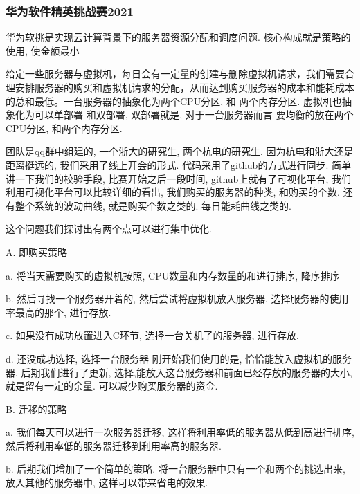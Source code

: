 \documentclass[UTF8]{ctexart}
\begin{document}
\subsubsection{华为软件精英挑战赛2021}
华为软挑是实现云计算背景下的服务器资源分配和调度问题.  核心构成就是策略的使用, 使金额最小 \par
给定一些服务器与虚拟机，每日会有一定量的创建与删除虚拟机请求，我们需要合理安排服务器的购买和虚拟机请求的分配，从而达到购买服务器的成本和能耗成本的总和最低。一台服务器的抽象化为两个CPU分区, 和 两个内存分区.  虚拟机也抽象化为可以单部署 和双部署, 双部署就是, 对于一台服务器而言 要均衡的放在两个CPU分区, 和两个内存分区. \par
团队是qq群中组建的, 一个浙大的研究生, 两个杭电的研究生. 因为杭电和浙大还是距离挺远的, 我们采用了线上开会的形式.  代码采用了github的方式进行同步. 简单讲一下我们的校验手段, 比赛开始之后一段时间, github上就有了可视化平台, 我们利用可视化平台可以比较详细的看出, 我们购买的服务器的种类, 和购买的个数.  还有整个系统的波动曲线, 就是购买个数之类的. 每日能耗曲线之类的. \par
这个问题我们探讨出有两个点可以进行集中优化. \par

A. 即购买策略\par
a. 将当天需要购买的虚拟机按照, CPU数量和内存数量的和进行排序, 降序排序\par
b. 然后寻找一个服务器开着的, 然后尝试将虚拟机放入服务器, 选择服务器的使用率最高的那个, 进行存放.\par
c. 如果没有成功放置进入C环节, 选择一台关机了的服务器, 进行存放.\par
d. 还没成功选择, 选择一台服务器 刚开始我们使用的是, 恰恰能放入虚拟机的服务器. 后期我们进行了更新, 选择,能放入这台服务器和前面已经存放的服务器的大小, 就是留有一定的余量. 可以减少购买服务器的资金.\par 
B. 迁移的策略\par
a. 我们每天可以进行一次服务器迁移, 这样将利用率低的服务器从低到高进行排序, 然后将利用率低的服务器迁移到利用率高的服务器.\par
b. 后期我们增加了一个简单的策略. 将一台服务器中只有一个和两个的挑选出来, 放入其他的服务器中, 这样可以带来省电的效果.\par
\end{document}
